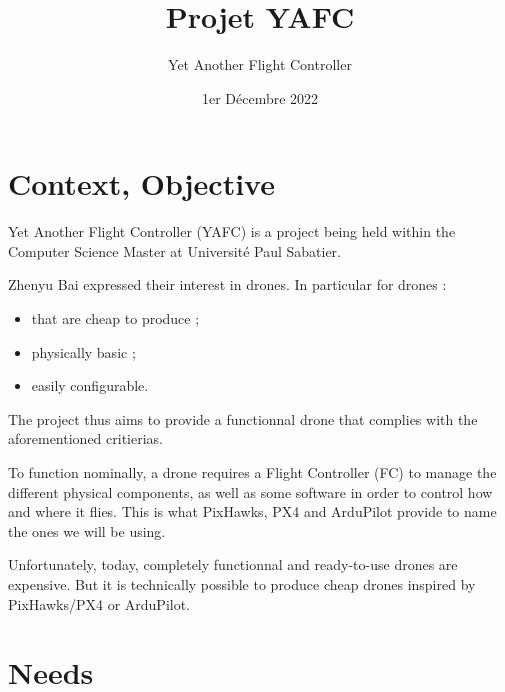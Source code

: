 \documentclass{beamer}
\title[YAFC]{Projet YAFC}
\subtitle{Yet Another Flight Controller}
\author[OYEZ]{Oussama Felfel \and
Yasmine Benhaddou\texorpdfstring{\\} \and
Elana Courtines \and
Zineb Moubarik}
\institute[UT3]{Université Paul Sabatier}
\date[01/12/2022]{1er Décembre 2022}
\begin{document}
\frame{\titlepage}


\section{Context, Objective}

\begin{frame}
    Yet Another Flight Controller (YAFC) is a project being held within the Computer Science Master at Université Paul Sabatier.

    \vspace*{5mm}

    Zhenyu Bai expressed their interest in drones. In particular for drones :
    \begin{itemize}
        \item that are cheap to produce ;
        \item physically basic ; 
        \item easily configurable.
    \end{itemize}
    
    \vspace*{5mm}

    The project thus aims to provide a functionnal drone that complies with the aforementioned critierias.
\end{frame}

\begin{frame}
    To function nominally, a drone requires a Flight Controller (FC) to manage the different physical components, as well as some software in order to control how and where it flies. This is what PixHawks, PX4 and ArduPilot provide to name the ones we will be using.

    \vspace*{5mm}

    Unfortunately, today, completely functionnal and ready-to-use drones are expensive. But it is technically possible to produce cheap drones inspired by PixHawks/PX4 or ArduPilot.

\end{frame}

\section{Needs}
\end{document}
